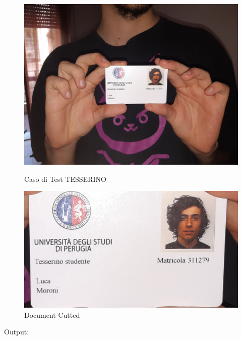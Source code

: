 \documentclass[12pt,a4paper]{article}
\begin{document}
\begin{figure}[!htb]
   \begin{minipage}{0.48\textwidth}
     \centering
     \includegraphics[width=.7\linewidth]{test_tesserino.jpg}
     \caption{Caso di Test TESSERINO}\label{Fig:}
   \end{minipage}\hfill
   \begin{minipage}{0.48\textwidth}
     \centering
     \includegraphics[width=.7\linewidth]{test_tesserino_cutting.jpg}
     \caption{Document Cutted}\label{Fig:}
   \end{minipage}
\end{figure}

Output:
\inputminted{python}{test_tesserino.py}
\end{document}
